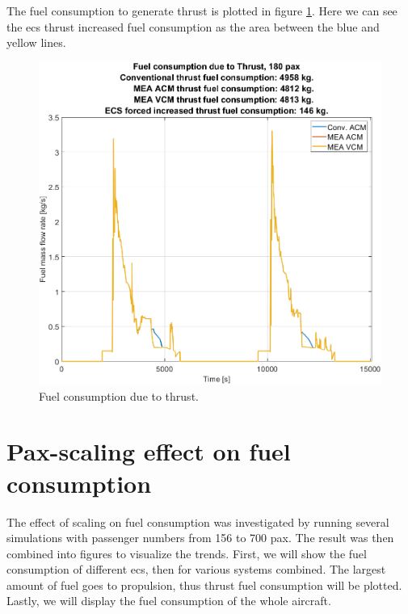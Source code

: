\documentclass[english]{kththesis}
\begin{document}
\clearpage

The fuel consumption to generate thrust is plotted in figure \ref{fig:ThrustFuel180pax}. Here we can see the \acrshort{ecs} thrust increased fuel consumption as the area between the blue and yellow lines.

\begin{figure}[!ht]
    \centering
    \includegraphics[width=1\textwidth]{Epictures/ThrustFuel180pax.png}
    \caption{Fuel consumption due to thrust.}
    \label{fig:ThrustFuel180pax}
\end{figure}


\clearpage
\section{Pax-scaling effect on fuel consumption}
\label{sec:paxscalingeffect}
The effect of scaling on fuel consumption was investigated by running several simulations with passenger numbers from 156 to 700 pax. The result was then combined into figures to visualize the trends.
First, we will show the fuel consumption of different \acrshort{ecs}, then for various systems combined. The largest amount of fuel goes to propulsion, thus thrust fuel consumption will be plotted. Lastly, we will display the fuel consumption of the whole aircraft.
\end{document}

